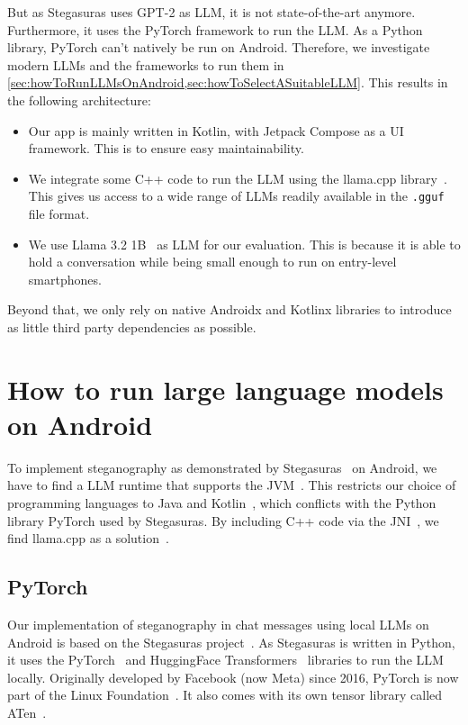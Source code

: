 But as Stegasuras uses GPT-2 as \gls{LLM}, it is not state-of-the-art anymore. Furthermore, it uses the PyTorch framework to run the \gls{LLM}. As a Python library, PyTorch can't natively be run on Android. Therefore, we investigate modern \glspl{LLM} and the frameworks to run them in \cref{sec:howToRunLLMsOnAndroid,sec:howToSelectASuitableLLM}. This results in the following architecture:
\begin{itemize}
	\item Our app is mainly written in Kotlin, with Jetpack Compose as a \gls{UI} framework. This is to ensure easy maintainability.
	\item We integrate some C++ code to run the \gls{LLM} using the llama.cpp library~\cite{gerganovGgerganovLlamacpp2024}. This gives us access to a wide range of \glspl{LLM} readily available in the \lstinline|.gguf| file format.
	\item We use Llama 3.2 1B~\cite{huggingquantsHuggingquantsLlama321BInstructQ4_K_MGGUFHugging2024} as \gls{LLM} for our evaluation. This is because it is able to hold a conversation while being small enough to run on entry-level smartphones.
\end{itemize}

Beyond that, we only rely on native Androidx and Kotlinx libraries to introduce as little third party dependencies as possible.

\section{How to run large language models on Android}
\label{sec:howToRunLLMsOnAndroid}
To implement steganography as demonstrated by Stegasuras~\cite{zieglerNeuralLinguisticSteganography2019} on Android, we have to find a \gls{LLM} runtime that supports the \gls{JVM}~\cite{ruggiaDarkSideNative2025}. This restricts our choice of programming languages to Java and Kotlin~\cite{ruggiaDarkSideNative2025}, which conflicts with the Python library PyTorch used by Stegasuras. By including C++ code via the \gls{JNI}~\cite{ruggiaDarkSideNative2025}, we find llama.cpp as a solution~\cite{gerganovGgerganovLlamacpp2024}.

\subsection{PyTorch}
\label{sec:pyTorch}
Our implementation of steganography in chat messages using local \glspl{LLM} on Android is based on the Stegasuras project~\cite{zieglerNeuralLinguisticSteganography2019}. As Stegasuras is written in Python, it uses the PyTorch~\cite{anselPyTorch2Faster2024} and HuggingFace Transformers~\cite{wolfTransformersStateoftheArtNatural2020} libraries to run the \gls{LLM} locally. Originally developed by Facebook (now Meta) since 2016, PyTorch is now part of the Linux Foundation~\cite{chintalaPyTorchStrengthensIts2022}. It also comes with its own tensor library called ATen~\cite{devitoZdevitoATen2025}.

